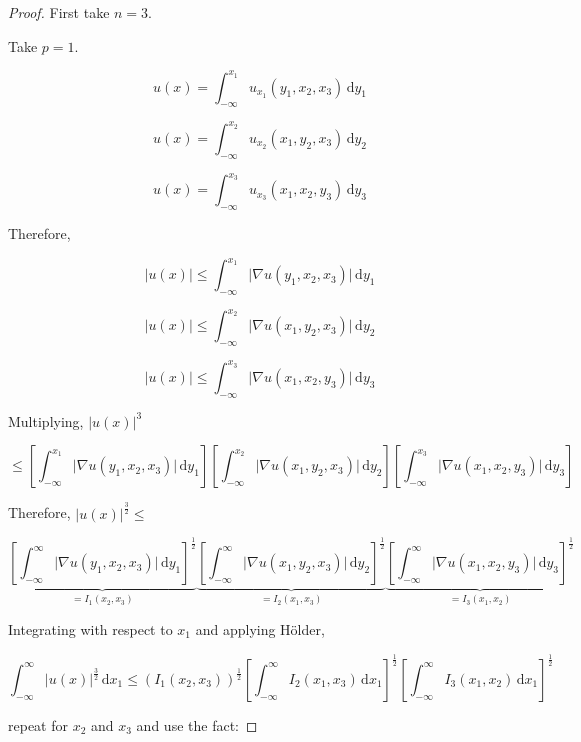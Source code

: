 \documentclass{article}
\theoremstyle{definition}
\begin{document}
\begin{proof}
    First take \(n = 3\).

    Take \(p = 1\).

    \[
        u(x) = \int_{-\infty}^{x_1} u_{x_1} (y_1, x_2, x_3) \,\mathrm{d}y_1 
    \]

    \[
        u(x) = \int_{-\infty}^{x_2} u_{x_2}(x_1, y_2, x_3) \,\mathrm{d}y_2 
    \]

    \[
        u(x) = \int_{-\infty}^{x_3} u_{x_3}(x_1, x_2, y_3) \,\mathrm{d}y_3 
    \]

    Therefore,

    \[
        \vert u(x) \vert \leq \int_{-\infty}^{x_1} \vert \nabla u(y_1, x_2, x_3) \vert  \,\mathrm{d}y_1 
    \]

    \[
        \vert u(x) \vert \leq \int_{-\infty}^{x_2} \vert \nabla u(x_1, y_2, x_3) \vert  \,\mathrm{d}y_2 
    \]

    \[
        \vert u(x) \vert \leq \int_{-\infty}^{x_3} \vert \nabla u(x_1, x_2, y_3) \vert  \,\mathrm{d}y_3 
    \]

    Multiplying, \(\vert u(x) \vert ^3\) 
    
    \[
        \leq \left[ \int_{-\infty}^{x_1} \vert \nabla u(y_1, x_2, x_3) \vert  \,\mathrm{d}y_1 \right] \left[ \int_{-\infty}^{x_2} \vert \nabla u(x_1, y_2, x_3) \vert  \,\mathrm{d}y_2 \right] \left[ \int_{-\infty}^{x_3} \vert \nabla u(x_1, x_2, y_3) \vert  \,\mathrm{d}y_3 \right] 
    \]

    Therefore, \(\vert u(x) \vert ^{\frac{3}{2}} \leq \) 

    \[
        \underbrace{\left[ \int_{-\infty}^{\infty} \vert \nabla u(y_1, x_2, x_3) \vert  \,\mathrm{d}y_1 \right]^{\frac{1}{2}}}_{=I_1(x_2, x_3)} \underbrace{\left[ \int_{-\infty}^{\infty} \vert \nabla u(x_1, y_2, x_3) \vert  \,\mathrm{d}y_2 \right]^{\frac{1}{2}}}_{=I_2(x_1,x_3)} \underbrace{\left[ \int_{-\infty}^{\infty} \vert \nabla u(x_1, x_2, y_3) \vert  \,\mathrm{d}y_3 \right]^{\frac{1}{2}}}_{=I_3(x_1,x_2)}
    \]

    Integrating with respect to \(x_1\) and applying H\"older,

    \[
        \int_{-\infty}^{\infty} \vert u(x) \vert ^{\frac{3}{2}} \,\mathrm{d}x_1 \leq (I_1(x_2, x_3))^{\frac{1}{2}} \left[ \int_{-\infty}^{\infty} I_2(x_1, x_3) \,\mathrm{d}x_1  \right] ^{\frac{1}{2}} \left[ \int_{-\infty}^{\infty} I_3(x_1, x_2) \,\mathrm{d}x_1  \right] ^{\frac{1}{2}}
    \]

    repeat for \(x_2\) and \(x_3\) and use the fact:


\end{proof}
\end{document}
